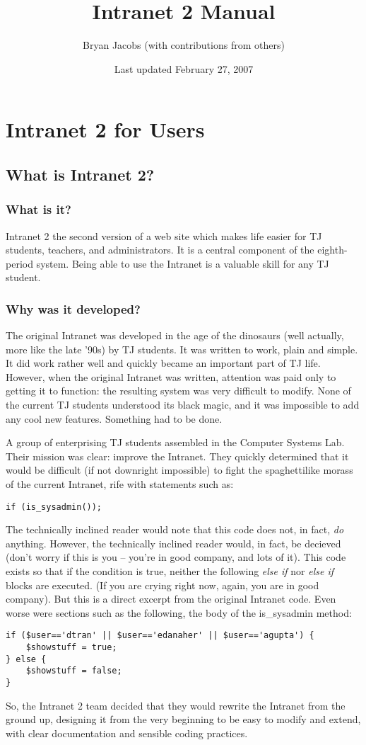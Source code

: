 \documentclass[11pt,letterpaper]{report}
\author{Bryan Jacobs (with contributions from others)}
\title{Intranet 2 Manual}
\date{Last updated February 27, 2007}
\begin{document}
\maketitle
\tableofcontents
\chapter{Intranet 2 for Users}
\section{What is Intranet 2?}
\subsection{What is it?}
Intranet 2 the second version of a web site which makes life easier for TJ students, teachers, and administrators.  
It is a central component of the eighth-period system.  Being able to use the Intranet is a valuable
skill for any TJ student.
\subsection{Why was it developed?}
The original Intranet was developed in the age of the dinosaurs (well actually, more like the late '90s) by TJ students.
It was written to work, plain and simple.  It did work rather well and quickly became an important part of TJ life.
However, when the original Intranet was written, attention was paid only to getting it to function: the resulting system
was very difficult to modify.  None of the current TJ students understood its black magic, and it was impossible to add
any cool new features.  Something had to be done.

A group of enterprising TJ students assembled in the Computer Systems Lab.  Their mission was clear: improve the Intranet.
They quickly determined that it would be difficult (if not downright impossible) to fight the spaghettilike morass of the
current Intranet, rife with statements such as:
\begin{lstlisting}
if (is_sysadmin());
\end{lstlisting}
The technically inclined reader would note that this code does not, in fact, \emph{do} anything.
However, the technically inclined reader would, in fact, be decieved (don't worry if this is you -- you're in
good company, and lots of it). This code exists so that if the condition is true,
neither the following \emph{else if} nor \emph{else if} blocks are executed.
(If you are crying right now, again, you are in good company).
But this is a direct excerpt from the original Intranet code.
Even worse were sections such as the following, the body of the is\_sysadmin method:
\begin{lstlisting}
if ($user=='dtran' || $user=='edanaher' || $user=='agupta') {
	$showstuff = true;
} else {
	$showstuff = false;
}
\end{lstlisting}
So, the Intranet 2 team decided that they would rewrite the Intranet from the ground up, designing it from the very beginning
to be easy to modify and extend, with clear documentation and sensible coding practices.
\end{document}
